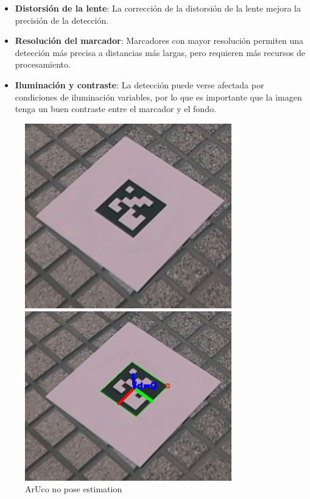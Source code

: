     \begin{itemize} 
        \item \textbf{Distorsión de la lente}: La corrección de la distorsión de la lente mejora la precisión de la detección. 
        \item \textbf{Resolución del marcador}: Marcadores con mayor resolución permiten una detección más precisa a distancias más largas, pero requieren más recursos de procesamiento. 
        \item \textbf{Iluminación y contraste}: La detección puede verse afectada por condiciones de iluminación variables, por lo que es importante que la imagen tenga un buen contraste entre el marcador y el fondo. 
    \end{itemize}

    \begin{figure}[h!] 
        \centering 
            \begin{minipage}{0.48\textwidth}
                \includegraphics[width=0.8\textwidth]{pictures/aruco_no_pose_estimation.png} %
                \caption{ArUco no pose estimation} 
                \label{fig:aruco_no_pose_estimation}
            \end{minipage}
            \begin{minipage}{0.48\textwidth}
                \includegraphics[width=0.8\textwidth]{pictures/aruco_pose_estimation.png} %

\end{minipage}
\end{figure}
